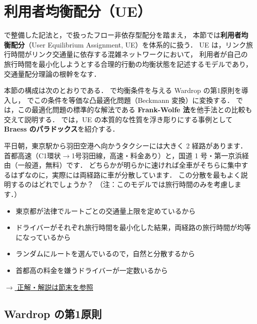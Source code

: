 
\section{利用者均衡配分（UE）}
\label{sec:ch3-ue}

で整備した記法と，で扱ったフロー非依存型配分を踏まえ，
本節では\textbf{利用者均衡配分}（User Equilibrium Assignment, UE）を体系的に扱う．
UE は，リンク旅行時間がリンク交通量に依存する混雑ネットワークにおいて，
利用者が自己の旅行時間を最小化しようとする合理的行動の均衡状態を記述するモデルであり，
交通量配分理論の根幹をなす\cite{Wardrop1952,Beckmann1956}．

本節の構成は次のとおりである．
 で均衡条件を与える Wardrop の第1原則を導入し，
 でこの条件を等価な凸最適化問題（Beckmann 変換）に変換する．
 では，この最適化問題の標準的な解法である
\textbf{Frank-Wolfe 法}を他手法との比較も交えて説明する．
 では，UE の本質的な性質を浮き彫りにする事例として
\textbf{Braess のパラドックス}を紹介する．

\begin{example}[title={クイズ 4：東京駅$\rightarrow$羽田空港，なぜ2経路に分かれる？}]
平日朝，東京駅から羽田空港へ向かうタクシーには大きく 2 経路があります．
首都高速（C1環状$\rightarrow$1号羽田線，高速・料金あり）と，国道 1 号・第一京浜経由（一般道，無料）です．
どちらかが明らかに速ければ全車がそちらに集中するはずなのに，実際には両経路に車が分散しています．
この分散を最もよく説明するのはどれでしょうか？
（注：このモデルでは旅行時間のみを考慮します．）
\begin{itemize}
  \item[(ア)] 東京都が法律でルートごとの交通量上限を定めているから
  \item[(イ)] ドライバーがそれぞれ旅行時間を最小化した結果，両経路の旅行時間が均等になっているから
  \item[(ウ)] ランダムにルートを選んでいるので，自然と分散するから
  \item[(エ)] 首都高の料金を嫌うドライバーが一定数いるから
\end{itemize}
\hyperref[ans:q4]{$\rightarrow$ 正解・解説は節末を参照}
\end{example}

\subsection{Wardrop の第1原則}
\label{subsec:wardrop}

